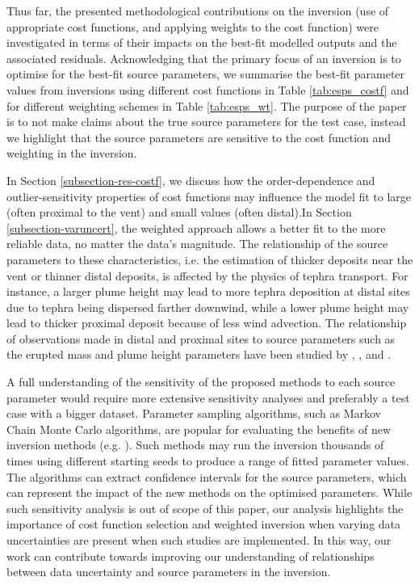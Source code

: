 Thus far, the presented methodological contributions on the inversion (use of appropriate cost functions, and applying weights to the cost function) were investigated in terms of their impacts on the best-fit modelled outputs and the associated residuals. Acknowledging that the primary focus of an inversion is to optimise for the best-fit source parameters, we summarise the best-fit parameter values from inversions using different cost functions in Table \ref{tab:esps_costf} and for different weighting schemes in Table \ref{tab:esps_wt}. The purpose of the paper is to not make claims about the true source parameters for the test case, instead we highlight that the source parameters are sensitive to the cost function and weighting in the inversion. 

In Section \ref{subsection-res-costf}, we discuss how the order-dependence and outlier-sensitivity properties of cost functions may influence the model fit to large (often proximal to the vent) and small values (often distal).In Section \ref{subsection-varuncert}, the weighted approach allows a better fit to the more reliable data, no matter the data's magnitude. The relationship of the source parameters to these characteristics, i.e. the estimation of thicker deposits near the vent or thinner distal deposits, is affected by the physics of tephra transport. For instance, a larger plume height may lead to more tephra deposition at distal sites due to tephra being dispersed farther downwind, while a lower plume height may lead to thicker proximal deposit because of less wind advection. The relationship of observations made in distal and proximal sites to source parameters such as the erupted mass and plume height parameters have been studied by \citet{suzuki1983theoretical}, \cite{bonadonna2005probabilistic}, and \cite{yang2021tephra}.

A full understanding of the sensitivity of the proposed methods to each source parameter would require more extensive sensitivity analyses and preferably a test case with a bigger dataset. Parameter sampling algorithms, such as Markov Chain Monte Carlo algorithms, are popular for evaluating the benefits of new inversion methods (e.g. \cite{white2017efficient, yang2021tephra}). Such methods may run the inversion thousands of times using different starting seeds to produce a range of fitted parameter values. The algorithms can extract confidence intervals for the source parameters, which can represent the impact of the new methods on the optimised parameters. While such sensitivity analysis is out of scope of this paper, our analysis highlights the importance of cost function selection and weighted inversion when varying data uncertainties are present when such studies are implemented. In this way, our work can contribute towards improving our understanding of relationships between data uncertainty and source parameters in the inversion.


